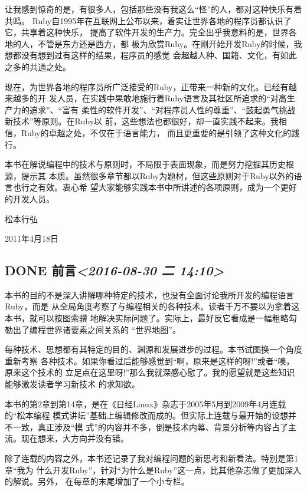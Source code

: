 \documentclass[color=cyan,mathpazo,titlestyle=hang]{elegantbook}
\begin{document}
让我感到惊奇的是，有很多人，包括那些没有我这么“怪”的人，都对这种快乐有着共鸣。
Ruby自1995年在互联网上公布以来，着实让世界各地的程序员都认识了它，共享着这种快乐，
提高了软件开发的生产力。完全出乎我意料的是，世界各地的人，不管是东方还是西方，都
极为欣赏Ruby。在刚开始开发Ruby的时候，我想都没有想到过有这样的结果，程序员的感觉
会超越人种、国籍、文化，有如此之多的共通之处。

现在，为世界各地的程序员所广泛接受的Ruby，正带来一种新的文化。已经有越来越多的开
发人员，在实践中果敢地施行着Ruby语言及其社区所追求的“对高生产力的追求”、“富有
柔性的软件开发”、“对程序员人性的尊重”、“鼓起勇气挑战新技术”等原则。在Ruby以
前，这些想法也都很好，却一直实践不起来。我相信，Ruby的卓越之处，不仅在于语言能力，
而且更重要的是引领了这种文化的践行。

本书在解说编程中的技术与原则时，不局限于表面现象，而是努力挖掘其历史根源，提示其
本质。虽然很多章节都以Ruby为题材，但这些原则对于Ruby以外的语言也行之有效。衷心希
望大家能够实践本书中所讲述的各项原则，成为一个更好的开发人员。

松本行弘

2011年4月18日
\begin{LaTeX}
  \newpage
\end{LaTeX}

\subsection{{\bfseries\sffamily DONE} 前言\textit{<2016-08-30 二 14:10>}}
\label{sec:org06c4286}
本书的目的不是深入讲解哪种特定的技术，也没有全面讨论我所开发的编程语言Ruby，而是
从全局角度考察了与编程相关的各种技术。读者千万不要以为拿着这本书，就可以按图索骥
地解决实际问题了。实际上，最好反它看成是一幅粗略勾勒出了编程世界诸要素之间关系的
“世界地图”。

每种技术、思想都有其特定的目的、渊源和发展进步的过程。本书试图换一个角度重新考察
各种技术。如果你看过后能够感觉到“啊，原来是这样的呀!”或者“噢，原来这个技术的
立足点在这里呀!”那么我就深感心慰了。我的愿望就是这些知识能够激发读者学习新技术
的求知欲。

本书的第2章到第14章，是在《日经Linux》杂志于2005年5月到2009年4月连载的“松本编程
模式讲坛”基础上编辑修改而成的。但实际上连载与最开始的设想并不一致，真正涉及“模
式”的内容并不多，倒是技术内幕、背景分析等内容占了主流。现在想来，大方向并没有错。

除了连载的内容之外，本书还记录了我对编程问题的新思考和新看法。特别是第1章“我为
什么开发Ruby”，针对“为什么是Ruby”这一点，比其他杂志做了更加深入的解说。另外，
在每章的末尾增加了一个小专栏。
\end{document}
